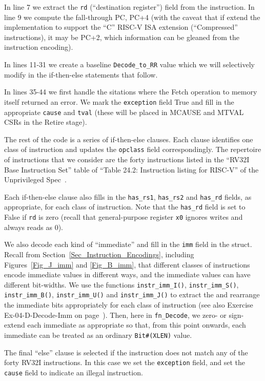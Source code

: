 In line 7 we extract the \verb|rd| (``destination register'') field
from the instruction.  In line 9 we compute the fall-through PC, PC+4
(with the caveat that if extend the implementation to support the
``C'' RISC-V ISA extension (``Compressed'' instructions), it may be
PC+2, which information can be gleaned from the instruction encoding).

In lines 11-31 we create a baseline \verb|Decode_to_RR| value which we
will selectively modify in the if-then-else statements that follow.

In lines 35-44 we first handle the sitations where the Fetch operation
to memory itself returned an error.  We mark the \verb|exception|
field True and fill in the appropriate \verb|cause| and \verb|tval|
(these will be placed in MCAUSE and MTVAL CSRs in the Retire stage).

The rest of the code is a series of if-then-else clauses. Each clause
identifies one class of instruction and updates the \verb|opclass|
field correspondingly.  The repertoire of instructions that we
consider are the forty instructions listed in the ``RV32I Base
Instruction Set'' table of ``Table 24.2: Instruction listing for
RISC-V'' of the Unprivileged Spec~\cite{RISCV_Unpriv_2019_12_13}.

Each if-then-else clause also fills in the \verb|has_rs1|,
\verb|has_rs2| and \verb|has_rd| fields, as appropriate, for each
class of instruction.  Note that the \verb|has_rd| field is set to
False if \verb|rd| is zero (recall that general-purpose register
\verb|x0| ignores writes and always reads as 0).

We also decode each kind of ``immediate'' and fill in the \verb|imm|
field in the struct.  Recall from
Section~\ref{Sec_Instruction_Encodings}, including
Figures~\ref{Fig_J_imm} and \ref{Fig_B_imm}, that different classes of
instructions encode immediate values in different ways, and the
immediate values can have different bit-widths.  We use the functions
\verb|instr_imm_I()|, \verb|instr_imm_S()|, \verb|instr_imm_B()|,
\verb|instr_imm_U()| and \verb|instr_imm_J()| to extract the and
rearrange the immediate bits appropriately for each class of
instruction (see also Exercise Ex-04-D-Decode-Imm on
page~\pageref{Ex-04-D-Decode-Imm}).  Then, here in \verb|fn_Decode|, we
zero- or sign-extend each immediate as appropriate so that, from this
point onwards, each immediate can be treated as an ordinary
\verb|Bit#(XLEN)| value.

The final ``else'' clause is selected if the instruction does not
match any of the forty RV32I instructions.  In this case we set the
\verb|exception| field, and set the \verb|cause| field to indicate an
illegal instruction.

